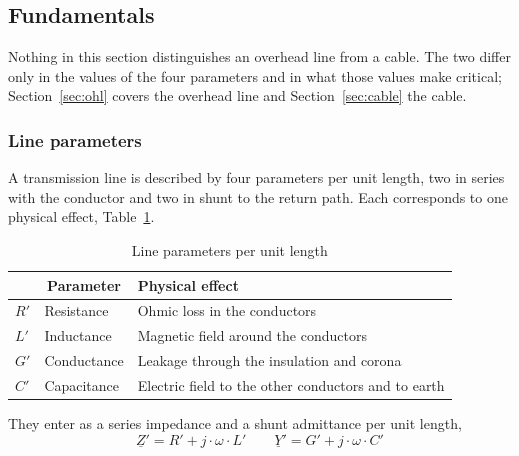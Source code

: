 \subsection{Fundamentals}
\label{sec:ac-transmission}

Nothing in this section distinguishes an overhead line from a cable. The two
differ only in the values of the four parameters and in what those values
make critical; Section~\ref{sec:ohl} covers the overhead line and
Section~\ref{sec:cable} the cable.


\subsubsection{Line parameters}
\label{sec:ac-parameters}

A transmission line is described by four parameters per unit length, two in
series with the conductor and two in shunt to the return path. Each
corresponds to one physical effect, Table~\ref{tab:ac-parameters}.

\begin{table}[!ht]
  \centering
  \begin{tabularx}{\linewidth}{@{}l l X@{}}
    \toprule
    & \multicolumn{1}{c}{\textbf{Parameter}} & \textbf{Physical effect} \\
    \midrule
    $R'$ & Resistance  & Ohmic loss in the conductors \\
    $L'$ & Inductance  & Magnetic field around the conductors \\
    $G'$ & Conductance & Leakage through the insulation and corona \\
    $C'$ & Capacitance & Electric field to the other conductors and to earth \\
    \bottomrule
  \end{tabularx}
  \caption{Line parameters per unit length}
  \label{tab:ac-parameters}
\end{table}

They enter as a series impedance and a shunt admittance per unit length,
\begin{equation}
  \underline{Z}' = R' + j \cdot \omega \cdot L'
  \qquad
  \underline{Y}' = G' + j \cdot \omega \cdot C'
  \label{eq:ac-zy-prime}
\end{equation}


